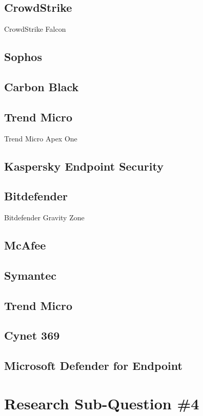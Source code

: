 \begin{multicols}{2}
      \subsection{CrowdStrike}
      CrowdStrike Falcon
      \subsection{Sophos}
      \subsection{Carbon Black}
      \subsection{Trend Micro}
      Trend Micro Apex One
      \subsection{Kaspersky Endpoint Security}
      \subsection{Bitdefender}
      Bitdefender Gravity Zone
      \subsection{McAfee}
      \subsection{Symantec}
      \subsection{Trend Micro}
      \subsection{Cynet 369}
      \subsection{Microsoft Defender for Endpoint}
      \section{Research Sub-Question \#4}
\end{multicols}